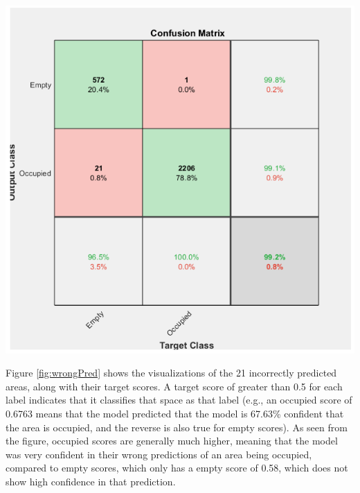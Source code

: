 \documentclass[man]{apa7}
\begin{document}
\begin{minipage}{\linewidth}
  \includegraphics[height=\textheight/4,width=\textwidth/2]{figures/confMatrix.png}
  \label{fig:confMatrix}
\end{minipage}

Figure \ref{fig:wrongPred} shows the visualizations of the 21 incorrectly predicted areas, along with their target scores. A target score of greater than 0.5 for each label indicates that it classifies that space as that label (e.g., an occupied score of 0.6763 means that the model predicted that the model is 67.63\% confident that the area is occupied, and the reverse is also true for empty scores). As seen from the figure, occupied scores are generally much higher, meaning that the model was very confident in their wrong predictions of an area being occupied, compared to empty scores, which only has a empty score of 0.58, which does not show high confidence in that prediction.

\newpage
\end{document}
